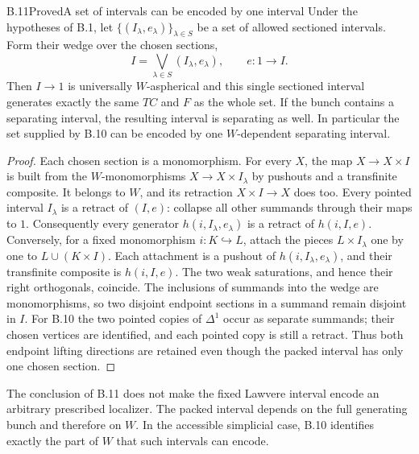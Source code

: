 \begin{claim}{B.11}{Proved}{A set of intervals can be encoded by one interval}\label{B11}
Under the hypotheses of B.1, let $\{(I_\lambda,e_\lambda)\}_{\lambda\in S}$
be a set of allowed sectioned intervals.  Form their wedge over the
chosen sections,
\[
 I=\bigvee_{\lambda\in S}(I_\lambda,e_\lambda),
 \qquad e:1\longrightarrow I.
\]
Then $I\to1$ is universally $W$-aspherical and this single sectioned
interval generates exactly the same $TC$ and $F$ as the whole set.
If the bunch contains a separating interval, the resulting interval is
separating as well.  In particular the set supplied by B.10 can be encoded
by one $W$-dependent separating interval.
\end{claim}
\begin{proof}
Each chosen section is a monomorphism.  For every $X$, the map
$X\to X\times I$ is built from the $W$-monomorphisms
$X\to X\times I_\lambda$ by pushouts and a transfinite composite.
It belongs to $W$, and its retraction $X\times I\to X$ does too.
Every pointed interval $I_\lambda$ is a retract of $(I,e)$: collapse all
other summands through their maps to $1$.  Consequently every generator
$h(i,I_\lambda,e_\lambda)$ is a retract of $h(i,I,e)$.
Conversely, for a fixed monomorphism $i:K\hookrightarrow L$, attach the
pieces $L\times I_\lambda$ one by one to
$L\cup(K\times I)$.  Each attachment is a pushout of
$h(i,I_\lambda,e_\lambda)$, and their transfinite composite is $h(i,I,e)$.
The two weak saturations, and hence their right orthogonals, coincide.
The inclusions of summands into the wedge are monomorphisms, so two
disjoint endpoint sections in a summand remain disjoint in $I$.
For B.10 the two pointed copies of $\Delta^1$ occur as separate summands;
their chosen vertices are identified, and each pointed copy is still a
retract.  Thus both endpoint lifting directions are retained even though
the packed interval has only one chosen section.
\end{proof}

The conclusion of B.11 does not make the fixed Lawvere interval encode an
arbitrary prescribed localizer.  The packed interval depends on the full
generating bunch and therefore on $W$.  In the accessible simplicial case,
B.10 identifies exactly the part of $W$ that such intervals can encode.


